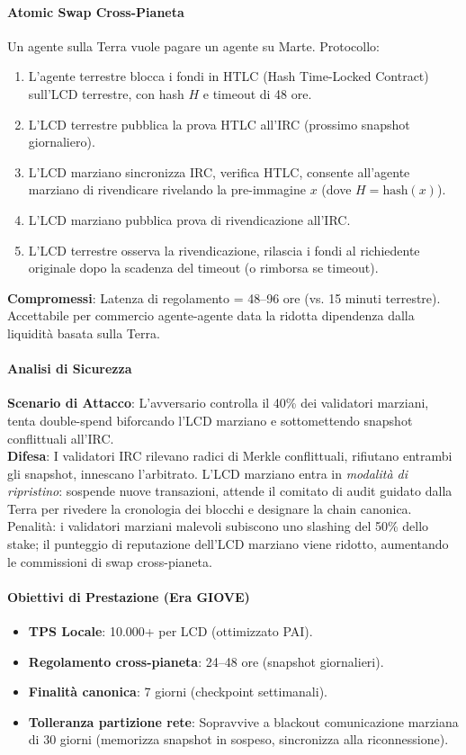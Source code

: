 \documentclass[11pt]{article}
\begin{document}
\paragraph{Atomic Swap Cross-Pianeta}
Un agente sulla Terra vuole pagare un agente su Marte. Protocollo:
\begin{enumerate}[noitemsep]
  \item L'agente terrestre blocca i fondi in HTLC (Hash Time-Locked Contract) sull'LCD terrestre, con hash $H$ e timeout di 48 ore.
  \item L'LCD terrestre pubblica la prova HTLC all'IRC (prossimo snapshot giornaliero).
  \item L'LCD marziano sincronizza IRC, verifica HTLC, consente all'agente marziano di rivendicare rivelando la pre-immagine $x$ (dove $H = \text{hash}(x)$).
  \item L'LCD marziano pubblica prova di rivendicazione all'IRC.
  \item L'LCD terrestre osserva la rivendicazione, rilascia i fondi al richiedente originale dopo la scadenza del timeout (o rimborsa se timeout).
\end{enumerate}
\textbf{Compromessi}: Latenza di regolamento = 48--96 ore (vs. 15 minuti terrestre). Accettabile per commercio agente-agente data la ridotta dipendenza dalla liquidità basata sulla Terra.

\paragraph{Analisi di Sicurezza}
\textbf{Scenario di Attacco}: L'avversario controlla il 40\% dei validatori marziani, tenta double-spend biforcando l'LCD marziano e sottomettendo snapshot conflittuali all'IRC.\\
\textbf{Difesa}: I validatori IRC rilevano radici di Merkle conflittuali, rifiutano entrambi gli snapshot, innescano l'arbitrato. L'LCD marziano entra in \emph{modalità di ripristino}: sospende nuove transazioni, attende il comitato di audit guidato dalla Terra per rivedere la cronologia dei blocchi e designare la chain canonica. Penalità: i validatori marziani malevoli subiscono uno slashing del 50\% dello stake; il punteggio di reputazione dell'LCD marziano viene ridotto, aumentando le commissioni di swap cross-pianeta.

\paragraph{Obiettivi di Prestazione (Era GIOVE)}
\begin{itemize}[noitemsep]
  \item \textbf{TPS Locale}: 10.000+ per LCD (ottimizzato PAI).
  \item \textbf{Regolamento cross-pianeta}: 24--48 ore (snapshot giornalieri).
  \item \textbf{Finalità canonica}: 7 giorni (checkpoint settimanali).
  \item \textbf{Tolleranza partizione rete}: Sopravvive a blackout comunicazione marziana di 30 giorni (memorizza snapshot in sospeso, sincronizza alla riconnessione).
\end{itemize}
\end{document}
